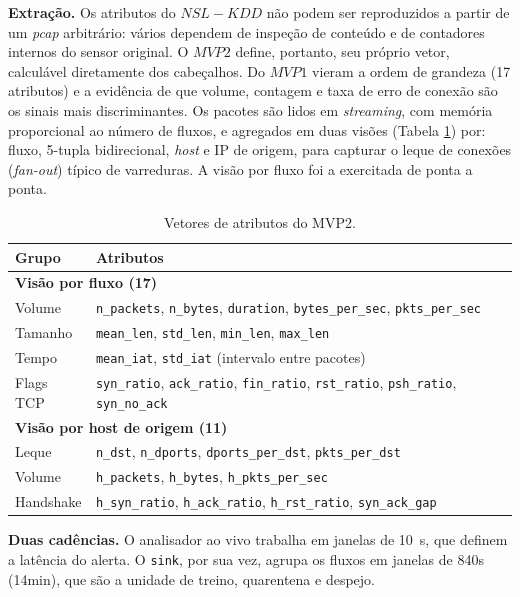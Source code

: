 \documentclass[a4paper,10pt, twocolumn]{article}
\begin{document}
\textbf{Extração.} Os atributos do $NSL-KDD$ não podem ser reproduzidos a partir de
um \textit{pcap} arbitrário: vários dependem de inspeção de conteúdo e de contadores
internos do sensor original. O $MVP2$ define, portanto, seu próprio vetor,
calculável diretamente dos cabeçalhos. Do $MVP1$ vieram a ordem de grandeza (17
atributos) e a evidência de que volume, contagem e taxa de erro de conexão são os
sinais mais discriminantes. Os pacotes são lidos em \textit{streaming}, com memória
proporcional ao número de fluxos, e agregados em duas
visões (Tabela \ref{tab:atributos}) por: fluxo, 5-tupla bidirecional, 
\textit{host} e IP de origem, para capturar o leque de conexões (\textit{fan-out})
típico de varreduras. A visão por fluxo foi a exercitada de ponta a ponta.

\begin{table}[H]
\centering
\footnotesize
\setlength{\tabcolsep}{3pt}
\begin{tabularx}{\columnwidth}{l X}
\toprule
\textbf{Grupo} & \textbf{Atributos} \\
\midrule
\multicolumn{2}{l}{\textbf{Visão por fluxo (17)}} \\
Volume      & \texttt{n\_packets}, \texttt{n\_bytes}, \texttt{duration}, \texttt{bytes\_per\_sec}, \texttt{pkts\_per\_sec} \\
Tamanho     & \texttt{mean\_len}, \texttt{std\_len}, \texttt{min\_len}, \texttt{max\_len} \\
Tempo       & \texttt{mean\_iat}, \texttt{std\_iat} (intervalo entre pacotes) \\
Flags TCP   & \texttt{syn\_ratio}, \texttt{ack\_ratio}, \texttt{fin\_ratio}, \texttt{rst\_ratio}, \texttt{psh\_ratio}, \texttt{syn\_no\_ack} \\
\midrule
\multicolumn{2}{l}{\textbf{Visão por host de origem (11)}} \\
Leque       & \texttt{n\_dst}, \texttt{n\_dports}, \texttt{dports\_per\_dst}, \texttt{pkts\_per\_dst} \\
Volume      & \texttt{h\_packets}, \texttt{h\_bytes}, \texttt{h\_pkts\_per\_sec} \\
Handshake   & \texttt{h\_syn\_ratio}, \texttt{h\_ack\_ratio}, \texttt{h\_rst\_ratio}, \texttt{syn\_ack\_gap} \\
\bottomrule
\end{tabularx}
\caption{Vetores de atributos do MVP2.}
\label{tab:atributos}
\end{table}

\textbf{Duas cadências.} O analisador ao vivo trabalha em janelas de 10~s, que
definem a latência do alerta. O \texttt{sink}, por sua vez, agrupa os fluxos em
janelas de 840s (14min), que são a unidade de treino, quarentena e despejo.
\end{document}
